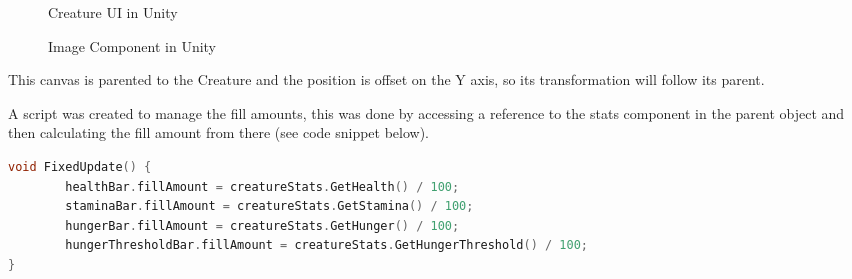 \documentclass[12pt]{report}
\begin{document}
\begin{figure}[H]
    \begin{minipage}{.5\textwidth}
        \centering
        \caption{Creature UI in Unity}
    \end{minipage}
    \begin{minipage}{.5\textwidth}
        \centering
        \caption{Image Component in Unity}
    \end{minipage}
\end{figure}

This canvas is parented to the Creature and the position is offset on the Y axis, so its transformation will follow its parent.

A script was created to manage the fill amounts, this was done by accessing a reference to the stats component in the parent object and then calculating the fill amount from there (see code snippet below).

\begin{lstlisting}[language=c]
void FixedUpdate() {
        healthBar.fillAmount = creatureStats.GetHealth() / 100;
        staminaBar.fillAmount = creatureStats.GetStamina() / 100;
        hungerBar.fillAmount = creatureStats.GetHunger() / 100;
        hungerThresholdBar.fillAmount = creatureStats.GetHungerThreshold() / 100;
}
\end{lstlisting}
\end{document}
